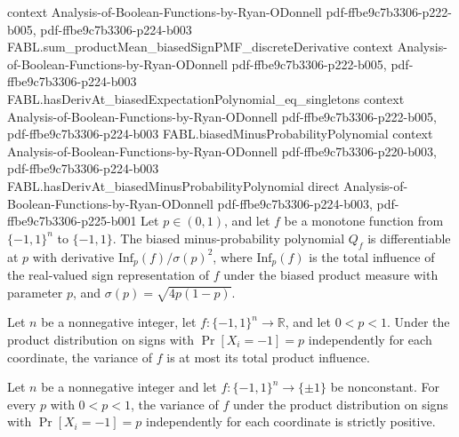 \begin{theorem}
  {context}
  {Analysis-of-Boolean-Functions-by-Ryan-ODonnell}
  {pdf-ffbe9c7b3306-p222-b005,
    pdf-ffbe9c7b3306-p224-b003}
\proofstep
  {FABL.sum_productMean_biasedSignPMF_discreteDerivative}
  {context}
  {Analysis-of-Boolean-Functions-by-Ryan-ODonnell}
  {pdf-ffbe9c7b3306-p222-b005,
    pdf-ffbe9c7b3306-p224-b003}
\proofstep
  {FABL.hasDerivAt_biasedExpectationPolynomial_eq_singletons}
  {context}
  {Analysis-of-Boolean-Functions-by-Ryan-ODonnell}
  {pdf-ffbe9c7b3306-p222-b005,
    pdf-ffbe9c7b3306-p224-b003}
\proofstep
  {FABL.biasedMinusProbabilityPolynomial}
  {context}
  {Analysis-of-Boolean-Functions-by-Ryan-ODonnell}
  {pdf-ffbe9c7b3306-p220-b003,
    pdf-ffbe9c7b3306-p224-b003}
\proofstep
  {FABL.hasDerivAt_biasedMinusProbabilityPolynomial}
  {direct}
  {Analysis-of-Boolean-Functions-by-Ryan-ODonnell}
  {pdf-ffbe9c7b3306-p224-b003,
    pdf-ffbe9c7b3306-p225-b001}
Let $p\in(0,1)$, and let $f$ be a monotone function from $\{-1,1\}^n$ to
$\{-1,1\}$. The biased minus-probability polynomial $Q_f$ is differentiable at $p$
with derivative $\mathrm{Inf}_p(f)/\sigma(p)^2$, where $\mathrm{Inf}_p(f)$ is the
total influence of the real-valued sign representation of $f$ under the biased product
measure with parameter $p$, and $\sigma(p)=\sqrt{4p(1-p)}$.
\end{theorem}

\begin{theorem}
\label{FABL.productVariance_le_productTotalInfluence_biased}
\leanok
{}
Let $n$ be a nonnegative integer, let $f:\{-1,1\}^n\to\mathbb R$, and let $0<p<1$. Under
the product distribution on signs with $\Pr[X_i=-1]=p$ independently for each
coordinate, the variance of $f$ is at most its total product influence.
\end{theorem}

\begin{theorem}
\label{FABL.productVariance_biased_pos_of_nonconstant}
\leanok
{}
Let $n$ be a nonnegative integer and let $f:\{-1,1\}^n\to\{\pm1\}$ be nonconstant. For
every $p$ with $0<p<1$, the variance of $f$ under the product distribution on signs with
$\Pr[X_i=-1]=p$ independently for each coordinate is strictly positive.
\end{theorem}

